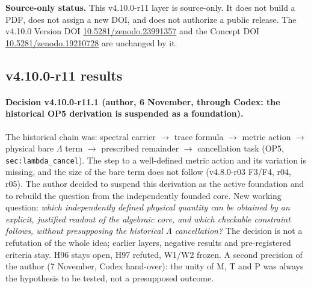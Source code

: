 \noindent\textbf{Source-only status.}
This v4.10.0-r11 layer is source-only.  It does not build a PDF, does not assign a new DOI,
and does not authorize a public release.  The v4.10.0 Version DOI
\href{https://doi.org/10.5281/zenodo.23991357}{10.5281/zenodo.23991357} and the Concept DOI
\href{https://doi.org/10.5281/zenodo.19210728}{10.5281/zenodo.19210728} are unchanged by it.

\subsection*{v4.10.0-r11 results}
\label{subsec:v4100-r11-results}

\paragraph{Decision v4.10.0-r11.1 (author, 6 November, through Codex: the historical OP5 derivation is suspended as a foundation).}
The historical chain was: spectral carrier \(\to\) trace formula \(\to\) metric action \(\to\) physical bare \(\Lambda\) term \(\to\) prescribed remainder \(\to\)
cancellation task (OP5, \texttt{sec:lambda\_cancel}).  The step to a well-defined metric action and its variation is missing, and the size of the bare term does
not follow (v4.8.0-r03 F3/F4, r04, r05).  The author decided to suspend this derivation as the active foundation and to rebuild the question from the
independently founded core.  New working question: \emph{which independently defined physical quantity can be obtained by an explicit, justified readout
of the algebraic core, and which checkable constraint follows, without presupposing the historical \(\Lambda\) cancellation?}  The decision is not a
refutation of the whole idea; earlier layers, negative results and pre-registered criteria stay.  H96 stays open, H97 refuted, W1/W2 frozen.  A
second precision of the author (7 November, Codex hand-over): the unity of M, T and P was always the hypothesis to be tested, not a presupposed outcome.

